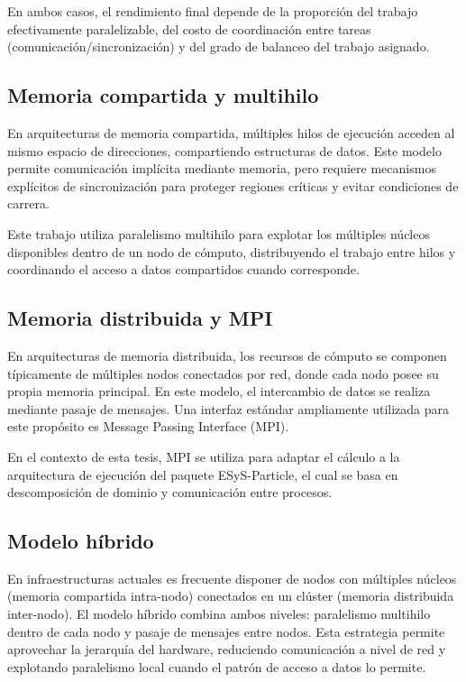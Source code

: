 \documentclass[a4paper,11pt]{book}
\begin{document}
En ambos casos, el rendimiento final depende de la proporción del trabajo efectivamente paralelizable, del costo de coordinación entre tareas (comunicación/sincronización) y del grado de balanceo del trabajo asignado.

\subsection{Memoria compartida y multihilo}

En arquitecturas de memoria compartida, múltiples hilos de ejecución acceden al mismo espacio de direcciones, compartiendo estructuras de datos. Este modelo permite comunicación implícita mediante memoria, pero requiere mecanismos explícitos de sincronización para proteger regiones críticas y evitar condiciones de carrera.

Este trabajo utiliza paralelismo multihilo para explotar los múltiples núcleos disponibles dentro de un nodo de cómputo, distribuyendo el trabajo entre hilos y coordinando el acceso a datos compartidos cuando corresponde.

\subsection{Memoria distribuida y MPI}

En arquitecturas de memoria distribuida, los recursos de cómputo se componen típicamente de múltiples nodos conectados por red, donde cada nodo posee su propia memoria principal. En este modelo, el intercambio de datos se realiza mediante pasaje de mensajes. Una interfaz estándar ampliamente utilizada para este propósito es Message Passing Interface (MPI).

En el contexto de esta tesis, MPI se utiliza para adaptar el cálculo a la arquitectura de ejecución del paquete ESyS-Particle, el cual se basa en descomposición de dominio y comunicación entre procesos.

\subsection{Modelo híbrido}

En infraestructuras actuales es frecuente disponer de nodos con múltiples núcleos (memoria compartida intra-nodo) conectados en un clúster (memoria distribuida inter-nodo). El modelo híbrido combina ambos niveles: paralelismo multihilo dentro de cada nodo y pasaje de mensajes entre nodos. Esta estrategia permite aprovechar la jerarquía del hardware, reduciendo comunicación a nivel de red y explotando paralelismo local cuando el patrón de acceso a datos lo permite.
\end{document}
